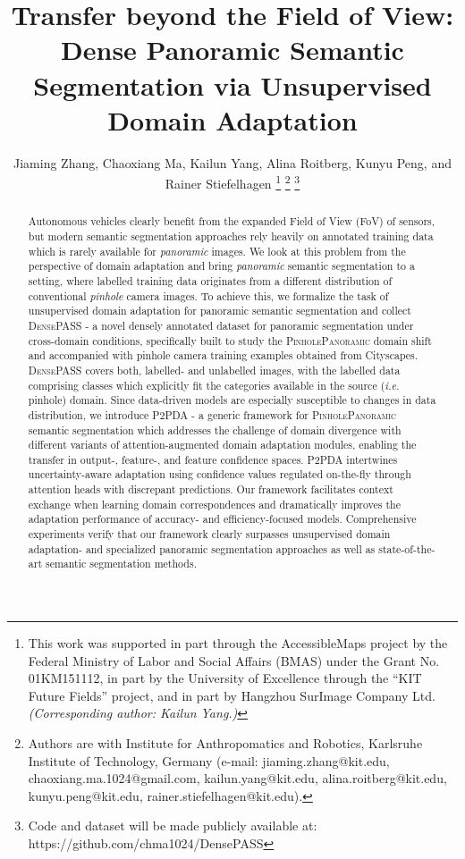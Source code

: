 \documentclass[journal]{IEEEtran}
\begin{document}
\title{Transfer beyond the Field of View: Dense Panoramic Semantic Segmentation via Unsupervised Domain Adaptation}
\author{Jiaming Zhang, Chaoxiang Ma, Kailun Yang, Alina Roitberg, Kunyu Peng, and Rainer Stiefelhagen
\thanks{This work was supported in part through the AccessibleMaps project by the Federal Ministry of Labor and Social Affairs (BMAS) under the Grant No. 01KM151112, in part by the University of Excellence through the ``KIT Future Fields'' project, and in part by Hangzhou SurImage Company Ltd.
\emph{(Corresponding author: Kailun Yang.)}}
\thanks{Authors are with Institute for Anthropomatics and Robotics, Karlsruhe Institute of Technology, Germany (e-mail: jiaming.zhang@kit.edu, chaoxiang.ma.1024@gmail.com, kailun.yang@kit.edu, alina.roitberg@kit.edu, kunyu.peng@kit.edu, rainer.stiefelhagen@kit.edu).}
\thanks{Code and dataset will be made publicly available at: https://github.com/chma1024/DensePASS}
}

\maketitle

\begin{abstract}
Autonomous vehicles clearly benefit from the expanded Field of View (FoV) of  sensors, but modern semantic segmentation approaches rely heavily on annotated training data which is rarely available for \emph{panoramic} images. We look at this problem from the perspective of domain adaptation and bring \emph{panoramic} semantic segmentation to a setting, where labelled training data originates from a different distribution of conventional \emph{pinhole} camera images. To achieve this, we formalize the task of unsupervised domain adaptation for panoramic semantic segmentation and collect \textsc{DensePASS} - a novel densely annotated dataset for panoramic segmentation under cross-domain conditions, specifically built to study the \textsc{PinholePanoramic} domain shift and accompanied with pinhole camera training examples obtained from Cityscapes. \textsc{DensePASS} covers both, labelled- and unlabelled  images, with the labelled data comprising  classes which explicitly fit the categories available in the source (\textit{i.e.} pinhole) domain. Since data-driven models are especially susceptible to changes in data distribution, we introduce P2PDA - a generic framework for \textsc{PinholePanoramic} semantic segmentation which addresses the challenge of domain divergence with different variants of attention-augmented domain adaptation modules, enabling the transfer in output-, feature-, and feature confidence spaces. P2PDA intertwines uncertainty-aware adaptation using confidence values regulated on-the-fly through attention heads with discrepant predictions. Our framework facilitates context exchange when learning domain correspondences and dramatically improves the adaptation performance of accuracy- and efficiency-focused models. Comprehensive experiments verify that our framework clearly surpasses unsupervised domain adaptation- and specialized panoramic segmentation approaches as well as state-of-the-art semantic segmentation methods.

\end{abstract}
\end{document}
